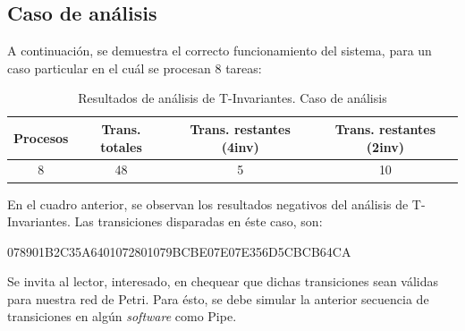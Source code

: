 \documentclass{article}
\begin{document}
    \subsection{Caso de análisis} \noindent
    A continuación, se demuestra el correcto funcionamiento del sistema, para un caso particular
    en el cuál se procesan 8 tareas:
    \begin{center}
        \begin{table}[H]
            \centering
            \begin{tabular}{||c|c|c|c||} 
                \hline
                Procesos & Trans. totales & Trans. restantes (4inv) & Trans. restantes (2inv) \\ [0.5ex] 
                \hline\hline
                8 & 48 & 5 & 10 \\ 
                \hline
            \end{tabular}
            \caption{Resultados de análisis de T-Invariantes. Caso de análisis}
        \end{table}
    \end{center} \par
    En el cuadro anterior, se observan los resultados negativos del análisis de 
    T-Invariantes. Las transiciones disparadas en éste caso, son: \newline 
    \begin{center}
        078901B2C35A6401072801079BCBE07E07E356D5CBCB64CA 
    \end{center}
    Se invita al lector, interesado, en chequear que dichas transiciones sean válidas para 
    nuestra red de Petri. Para ésto, se debe simular la anterior secuencia de transiciones
    en algún \emph{software} como Pipe.
\end{document}
